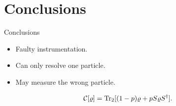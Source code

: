 \section{Conclusions}

\begin{frame}{Conclusions}
    \begin{itemize}
        \item Faulty instrumentation.
        \item Can only resolve one particle.
        \item May measure the wrong particle.
    \end{itemize}
    \begin{equation*}
        \mathcal{C}[\varrho]=\Tr_{2}[(1-p)\varrho+pS\varrho S^{\dag}].
    \end{equation*}
\end{frame}